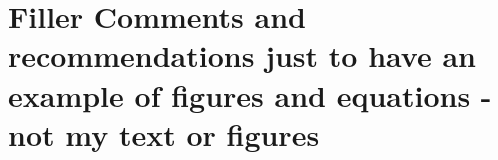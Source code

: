 \section{Filler Comments and recommendations just to have an example of figures and equations - not my text or figures}

